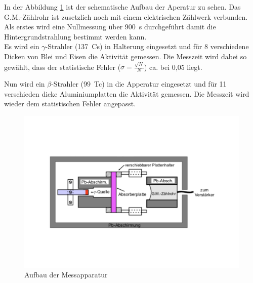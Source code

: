 In der Abbildung \ref{fig:Aufbau} ist der schematische Aufbau der Aperatur zu sehen.
Das G.M.-Zählrohr ist zusetzlich noch mit einem elektrischen Zählwerk verbunden.
Als erstes wird eine Nullmessung über \SI{900}{s} durchgeführt damit die Hintergrundstrahlung bestimmt werden kann.\\

Es wird ein $\gamma$-Strahler (\SI{137}{Cs}) in Halterung eingesetzt und für 8 verschiedene Dicken von Blei und Eisen die Aktivität gemessen.
Die Messzeit wird dabei so gewählt, dass der statistische Fehler ($\sigma=\frac{\sqrt{N}}{N}$) ca. bei 0,05 liegt.

Nun wird ein $\beta$-Strahler (\SI{99}{Tc}) in die Apperatur eingesetzt und für 11 verschieden dicke Aluminiumplatten die Aktivität gemessen.
Die Messzeit wird wieder dem statistischen Fehler angepasst.
\begin{figure}[h!]
  \centering
  \includegraphics[width=\textwidth]{aufbau.pdf}
  \caption{Aufbau der Messapparatur \cite{1}}
  \label{fig:Aufbau}
\end{figure}
